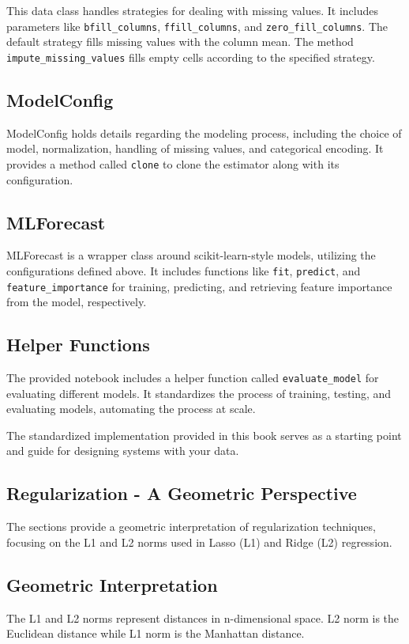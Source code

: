 \documentclass{article}
\begin{document}
This data class handles strategies for dealing with missing values. It includes parameters like \texttt{bfill\_columns}, \texttt{ffill\_columns}, and \texttt{zero\_fill\_columns}. The default strategy fills missing values with the column mean. The method \texttt{impute\_missing\_values} fills empty cells according to the specified strategy.

\subsection{ModelConfig}

ModelConfig holds details regarding the modeling process, including the choice of model, normalization, handling of missing values, and categorical encoding. It provides a method called \texttt{clone} to clone the estimator along with its configuration.

\subsection{MLForecast}

MLForecast is a wrapper class around scikit-learn-style models, utilizing the configurations defined above. It includes functions like \texttt{fit}, \texttt{predict}, and \texttt{feature\_importance} for training, predicting, and retrieving feature importance from the model, respectively.

\subsection{Helper Functions}

The provided notebook includes a helper function called \texttt{evaluate\_model} for evaluating different models. It standardizes the process of training, testing, and evaluating models, automating the process at scale.

The standardized implementation provided in this book serves as a starting point and guide for designing systems with your data.

\subsection{Regularization - A Geometric Perspective}
The sections provide a geometric interpretation of regularization techniques, focusing on the L1 and L2 norms used in Lasso (L1) and Ridge (L2) regression.

\subsection{Geometric Interpretation}
The L1 and L2 norms represent distances in n-dimensional space. L2 norm is the Euclidean distance while L1 norm is the Manhattan distance.
\end{document}
